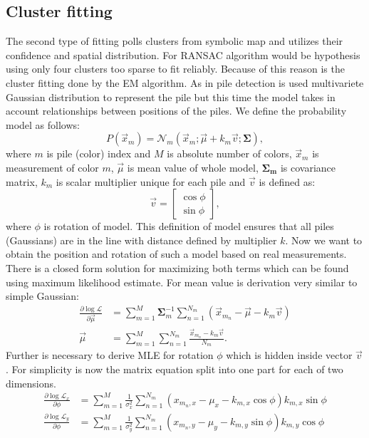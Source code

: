 \subsection{Cluster fitting}
The second type of fitting polls clusters from symbolic map and utilizes their confidence and spatial distribution. For RANSAC algorithm would be hypothesis using only four clusters too sparse to fit reliably. Because of this reason is the cluster fitting done by the EM algorithm. As in pile detection is used multivariete Gaussian distribution to represent the pile but this time the model takes in account relationships between positions of the piles. We define the probability model as follows:
\begin{equation}
P(\vec{x}_m) = \mathcal{N}_m(\vec{x}_m; \vec{\mu} + k_m\vec{v}; \bm{\Sigma}),
\end{equation}
where $m$ is pile (color) index and $M$ is absolute number of colors, $\vec{x}_m$ is measurement of color $m$, $\vec{\mu}$ is mean value of whole model, $\bm{\Sigma_m}$ is covariance matrix, $k_m$ is scalar multiplier unique for each pile and $\vec{v}$ is defined as:
\begin{equation}
\vec{v} = \begin{bmatrix}
\cos \phi \\
\sin \phi
\end{bmatrix},
\end{equation}
where $\phi$ is rotation of model. This definition of model ensures that all piles (Gaussians) are in the line with distance defined by multiplier $k$. Now we want to obtain the position and rotation of such a model based on real measurements. There is a closed form solution for maximizing both terms which can be found using maximum likelihood estimate. For mean value is derivation very similar to simple Gaussian:
\begin{align}
\frac{\partial \log\mathcal{L} }{\partial \vec{\mu}} &= \sum_{m=1}^M \bm{\Sigma}^{-1}_m \sum_{n = 1}^{N_m} (\vec{x}_{m_n} - \vec{\mu} - k_m \vec{v}) \\
\vec{\mu} &= \sum_{m=1}^M \sum_{n = 1}^{N_m} \frac{\vec{x}_{m_n} - k_m \vec{v}}{N_m}.
\end{align}
Further is necessary to derive MLE for rotation $\phi$ which is hidden inside vector $\vec{v}$. For simplicity is now the matrix equation split into one part for each of two dimensions.  
\begin{align}
\frac{\partial \log\mathcal{L}_x }{\partial \phi} &= \sum_{m=1}^{M} \frac{1}{\sigma^2_x} \sum_{n=1}^{N_m} (x_{m_n, x} - \mu_x - k_{m, x} \cos \phi) k_{m,x} \sin \phi \\
\frac{\partial \log\mathcal{L}_y }{\partial \phi} &= \sum_{m=1}^{M} \frac{1}{\sigma^2_y} \sum_{n=1}^{N_m} (x_{m_n, y} - \mu_y - k_{m, y} \sin \phi) k_{m,y} \cos \phi
\end{align}
